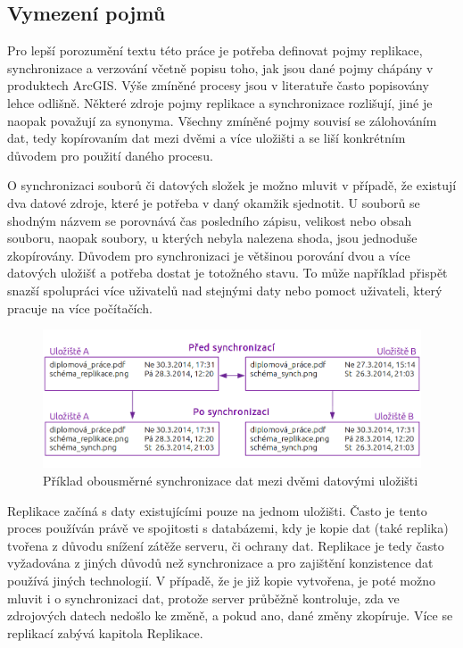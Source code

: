         \subsection{Vymezení pojmů}
Pro lepší porozumění textu této práce je potřeba definovat pojmy replikace, synchronizace a verzování včetně popisu toho, jak jsou dané pojmy chápány v produktech ArcGIS. Výše zmíněné procesy jsou v literatuře často popisovány lehce odlišně. Některé zdroje pojmy replikace a synchronizace rozlišují, jiné je naopak považují za synonyma. Všechny zmíněné pojmy souvisí se zálohováním dat, tedy kopírovaním dat mezi dvěmi a více uložišti a se liší konkrétním důvodem pro použití daného procesu. 

O synchronizaci souborů či datových složek je možno mluvit v případě, že existují dva datové zdroje, které je potřeba v daný okamžik sjednotit. U souborů se shodným názvem se porovnává čas posledního zápisu, velikost nebo obsah souboru, naopak soubory, u kterých nebyla nalezena shoda, jsou jednoduše zkopírovány. Důvodem pro synchronizaci je většinou porování dvou a více datových uložišť a potřeba dostat je totožného stavu. To může například přispět snazší spolupráci více uživatelů nad stejnými daty nebo pomoct uživateli, který pracuje na více počítačích. 

          \begin{figure}[H]
            \centering
            \includegraphics[scale=1]{../../../grafy/obr/schema_synchronizace_maxiTence.png}
            \caption {Příklad obousměrné synchronizace dat mezi dvěmi datovými uložišti}
          \end{figure}

Replikace začíná s daty existujícími pouze na jednom uložišti. Často je tento proces používán právě ve spojitosti s databázemi, kdy je kopie dat (také replika) tvořena z důvodu snížení zátěže serveru, či ochrany dat. Replikace je tedy často vyžadována z jiných důvodů než synchronizace a pro zajištění konzistence dat používá jiných technologií. V případě, že je již kopie vytvořena, je poté možno mluvit i o synchronizaci dat, protože server průběžně kontroluje, zda ve zdrojových datech nedošlo ke změně, a pokud ano, dané změny zkopíruje. Více se replikací zabývá kapitola  Replikace.

